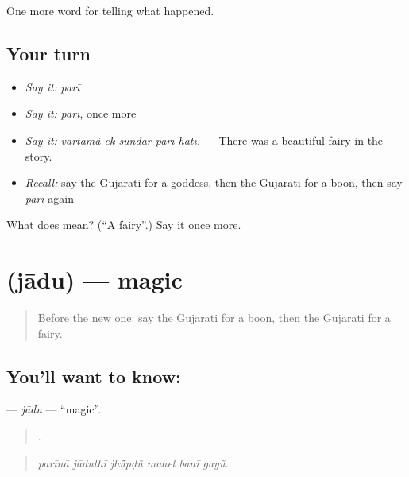 \begin{grammarlens}[title={What you've built}]
One more word for telling what happened.
\end{grammarlens}

\subsection*{Your turn}
\begin{itemize}
\raggedright
  \item \emph{Say it:} \emph{parī}
  \item \emph{Say it:} \emph{parī}, once more
  \item \emph{Say it:} \emph{vārtāmā̃ ek sundar parī hatī.} — There was a beautiful fairy in the story.
  \item \emph{Recall:} say the Gujarati for a goddess, then the Gujarati for a boon, then say \emph{parī} again
\end{itemize}

\begin{tcolorbox}[breakable,colback=teal!4,colframe=teal!35!black,title={Before you move on}]
What does  mean? (\textquotedblleft{}A fairy\textquotedblright{}.) Say it once more.
\end{tcolorbox}
\section[\texorpdfstring{\gu{જાદુ} (jādu)}{જાદુ (jādu)}]{ (jādu) — magic}

\label{lesson:GU-C333-jadu}



\begin{quote}
Before the new one: say the Gujarati for a boon, then the Gujarati for a fairy.
\end{quote}

\subsection*{You'll want to know: }
\textbf{} — \emph{jādu} — \textquotedblleft{}magic\textquotedblright{}.

\begin{quote}
     .
\end{quote}

\begin{quote}
\emph{parīnā jāduthī jhū̃pḍũ mahel banī gayũ.}
\end{quote}

